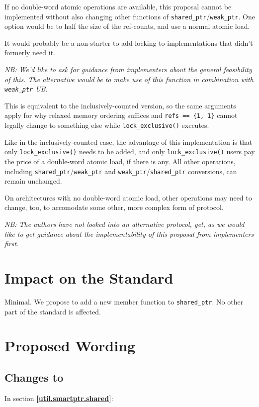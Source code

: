 \documentclass[11pt]{article}
\newcommand{\wgpaper}[1]{\href{https://wg21.link/#1}{#1}}
\newcommand{\isref}[1]{\textbf{[\wgpaper{#1}]}}
\newcommand{\lockx}{\texttt{lock\_exclusive()}}
\newcommand{\wptr}{\texttt{weak\_ptr}}
\newcommand{\sptr}{\texttt{shared\_ptr}}
\begin{document}
If no double-word atomic operations are available, this proposal
cannot be implemented without also changing other functions of
\sptr/\wptr. One option would be to half the size of the ref-counts,
and use a normal atomic load.

It would probably be a non-starter to add locking to implementations
that didn't formerly need it.

\emph{NB: We'd like to ask for guidance from implementers about the
  general feasibility of this. The alternative would be to make use of
  this function in combination with \wptr{} UB.}

This is equivalent to the inclusively-counted version, so the same
arguments apply for why relaxed memory ordering suffices and
\texttt{refs == \{1, 1\}} cannot legally change to something else
while \lockx{} executes.

Like in the inclusively-counted case, the advantage of this
implementation is that only \lockx{} needs to be added, and only
\lockx{} users pay the price of a double-word atomic load, if there is
any. All other operations, including \sptr/\wptr{} and \wptr/\sptr{}
conversions, can remain unchanged.

On architectures with no double-word atomic load, other operations may
need to change, too, to accomodate some other, more complex form of
protocol.

\emph{NB: The authors have not looked into an alternative protocol,
  yet, as we would like to get guidance about the implementability of
  this proposal from implementers first}.

\fi

\section{Impact on the Standard}

Minimal. We propose to add a new member function to \sptr{}. No other
part of the standard is affected.

\section{Proposed Wording}

\subsection{Changes to \cite{cpp2a}}

In section \isref{util.smartptr.shared}:
\end{document}
